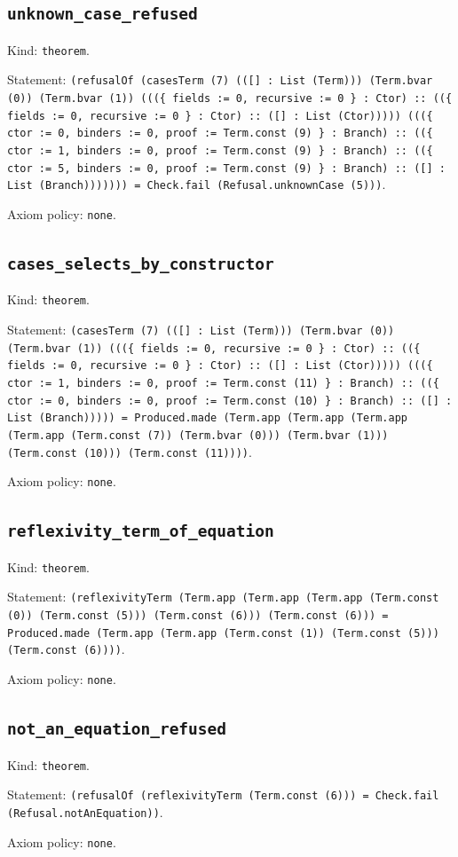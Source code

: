 \documentclass[11pt]{article}
\begin{document}
\subsection*{\texttt{unknown\_case\_refused}}
\noindent Kind: \texttt{theorem}.\par
\noindent Statement: \texttt{(refusalOf (casesTerm (7) (([] : List (Term))) (Term.bvar (0)) (Term.bvar (1)) (((\{ fields := 0, recursive := 0 \} : Ctor) :: ((\{ fields := 0, recursive := 0 \} : Ctor) :: ([] : List (Ctor))))) (((\{ ctor := 0, binders := 0, proof := Term.const (9) \} : Branch) :: ((\{ ctor := 1, binders := 0, proof := Term.const (9) \} : Branch) :: ((\{ ctor := 5, binders := 0, proof := Term.const (9) \} : Branch) :: ([] : List (Branch))))))) = Check.fail (Refusal.unknownCase (5)))}.\par
\noindent Axiom policy: \texttt{none}.\par
\subsection*{\texttt{cases\_selects\_by\_constructor}}
\noindent Kind: \texttt{theorem}.\par
\noindent Statement: \texttt{(casesTerm (7) (([] : List (Term))) (Term.bvar (0)) (Term.bvar (1)) (((\{ fields := 0, recursive := 0 \} : Ctor) :: ((\{ fields := 0, recursive := 0 \} : Ctor) :: ([] : List (Ctor))))) (((\{ ctor := 1, binders := 0, proof := Term.const (11) \} : Branch) :: ((\{ ctor := 0, binders := 0, proof := Term.const (10) \} : Branch) :: ([] : List (Branch))))) = Produced.made (Term.app (Term.app (Term.app (Term.app (Term.const (7)) (Term.bvar (0))) (Term.bvar (1))) (Term.const (10))) (Term.const (11))))}.\par
\noindent Axiom policy: \texttt{none}.\par
\subsection*{\texttt{reflexivity\_term\_of\_equation}}
\noindent Kind: \texttt{theorem}.\par
\noindent Statement: \texttt{(reflexivityTerm (Term.app (Term.app (Term.app (Term.const (0)) (Term.const (5))) (Term.const (6))) (Term.const (6))) = Produced.made (Term.app (Term.app (Term.const (1)) (Term.const (5))) (Term.const (6))))}.\par
\noindent Axiom policy: \texttt{none}.\par
\subsection*{\texttt{not\_an\_equation\_refused}}
\noindent Kind: \texttt{theorem}.\par
\noindent Statement: \texttt{(refusalOf (reflexivityTerm (Term.const (6))) = Check.fail (Refusal.notAnEquation))}.\par
\noindent Axiom policy: \texttt{none}.\par
\end{document}
